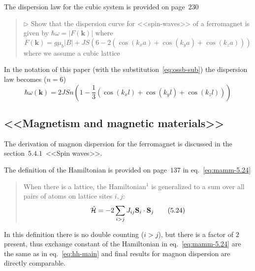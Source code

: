     The dispersion law for the cubic system is provided  on page~$230$
    \begin{quote}
        $\triangleright$ Show that the dispersion curve for <<spin-waves>> of a ferromagnet is given by $\hbar\omega = \vert F(\mathbf{k})\vert$  where
        \begin{equation}
            F(\mathbf{k}) = g\mu_b\vert B \vert + JS\left(6 - 2\left(\cos(k_xa) + \cos(k_ya) + \cos(k_za)\right)\right)
        \end{equation}
        where we assume a cubic lattice
    \end{quote}

    In the notation of this paper (with the substitution~\eqref{eq:ossb-sub}) the dispersion law becomes ($n = 6$)
    \begin{equation}
        \hbar\omega(\mathbf{k}) = 2JSn\left(1 - \dfrac{1}{3}\left(\cos(k_xl) + \cos(k_yl) + \cos(k_zl)\right)\right)
    \end{equation}
\subsection{<<Magnetism and magnetic materials>>\cite{coey2010magnetism}}
    The derivation of magnon dispersion for the ferromagnet is discussed in the section~$5.4.1$~<<Spin waves>>.

    The definition of the Hamiltonian is provided on page~$137$ in eq.~\eqref{eq:mamm-5.24}

    \begin{quote}
        When there is a lattice, the Hamiltonian$^1$ is generalized to a sum over all pairs of atoms on lattice sites $i, j$:
        \begin{equation}
            \hat{\mathcal{H}} = -2\sum_{i > j} J_{ij} \mathbf{S}_i \cdot \mathbf{S}_j \label{eq:mamm-5.24} \tag{5.24}
        \end{equation}
    \end{quote}

    In this definition there is no double counting ($i > j$), but there is a factor of $2$ present, thus exchange constant of the Hamiltonian in eq.~\eqref{eq:mamm-5.24} are the same as in eq.~\eqref{eq:hh-main}
    and final results for magnon dispersion are directly comparable.

